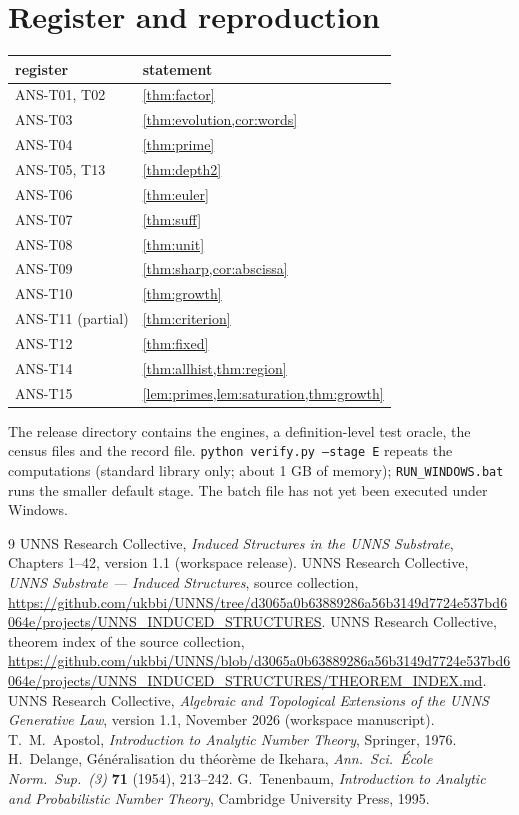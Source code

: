 \documentclass[11pt,a4paper]{article}
\begin{document}
\section{Register and reproduction}\label{sec:register}
\begin{center}\small
\begin{tabular}{ll}\toprule
register & statement\\\midrule
ANS-T01, T02 & \cref{thm:factor}\\
ANS-T03 & \cref{thm:evolution,cor:words}\\
ANS-T04 & \cref{thm:prime}\\
ANS-T05, T13 & \cref{thm:depth2}\\
ANS-T06 & \cref{thm:euler}\\
ANS-T07 & \cref{thm:suff}\\
ANS-T08 & \cref{thm:unit}\\
ANS-T09 & \cref{thm:sharp,cor:abscissa}\\
ANS-T10 & \cref{thm:growth}\\
ANS-T11 (partial) & \cref{thm:criterion}\\
ANS-T12 & \cref{thm:fixed}\\
ANS-T14 & \cref{thm:allhist,thm:region}\\
ANS-T15 & \cref{lem:primes,lem:saturation,thm:growth}\\
\bottomrule
\end{tabular}
\end{center}
The release directory contains the engines, a definition-level test oracle, the census files and the record file.
\texttt{python verify.py --stage E} repeats the computations (standard library only; about 1 GB of memory);
\texttt{RUN\_WINDOWS.bat} runs the smaller default stage. The batch file has not yet been executed under Windows.

\begin{thebibliography}{9}
 UNNS Research Collective, \emph{Induced Structures in the UNNS Substrate}, Chapters 1--42,
version 1.1 (workspace release).
 UNNS Research Collective, \emph{UNNS Substrate --- Induced Structures}, source collection,
\url{https://github.com/ukbbi/UNNS/tree/d3065a0b63889286a56b3149d7724e537bd6064e/projects/UNNS_INDUCED_STRUCTURES}.
 UNNS Research Collective, theorem index of the source collection,
\url{https://github.com/ukbbi/UNNS/blob/d3065a0b63889286a56b3149d7724e537bd6064e/projects/UNNS_INDUCED_STRUCTURES/THEOREM_INDEX.md}.
 UNNS Research Collective, \emph{Algebraic and Topological Extensions of the UNNS
Generative Law}, version 1.1, November 2026 (workspace manuscript).
 T.~M.~Apostol, \emph{Introduction to Analytic Number Theory}, Springer, 1976.
 H.~Delange, G\'en\'eralisation du th\'eor\`eme de Ikehara,
\emph{Ann.\ Sci.\ \'Ecole Norm.\ Sup.\ (3)} \textbf{71} (1954), 213--242.
 G.~Tenenbaum, \emph{Introduction to Analytic and Probabilistic Number Theory},
Cambridge University Press, 1995.
\end{thebibliography}
\end{document}
